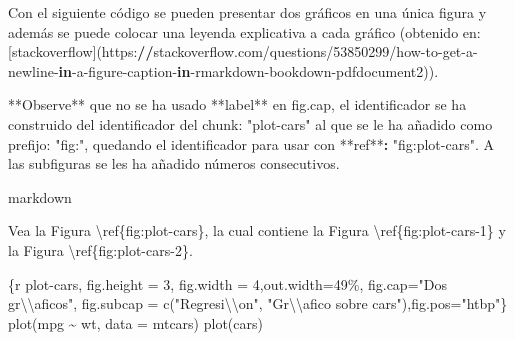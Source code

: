 \documentclass[11pt,a4paper,oneside,]{article}
\newenvironment{Shaded}{\begin{snugshade}}{\end{snugshade}}
\newcommand{\AttributeTok}[1]{\textcolor[rgb]{0.77,0.63,0.00}{#1}}
\newcommand{\ControlFlowTok}[1]{\textcolor[rgb]{0.13,0.29,0.53}{\textbf{#1}}}
\newcommand{\DecValTok}[1]{\textcolor[rgb]{0.00,0.00,0.81}{#1}}
\newcommand{\ErrorTok}[1]{\textcolor[rgb]{0.64,0.00,0.00}{\textbf{#1}}}
\newcommand{\NormalTok}[1]{#1}
\newcommand{\SpecialCharTok}[1]{\textcolor[rgb]{0.00,0.00,0.00}{#1}}
\newcommand{\StringTok}[1]{\textcolor[rgb]{0.31,0.60,0.02}{#1}}
\numberwithin{dummy}{section}
\theoremstyle{ocrenumbox}
\theoremstyle{blacknumex}
\theoremstyle{blacknumbox}
\theoremstyle{ocrenum}
\theoremstyle{ocrenum}
\begin{document}
\begin{Shaded}
\begin{Highlighting}[numbers=left,,]
\NormalTok{Con el siguiente código se pueden presentar dos gráficos en una única figura y además se puede colocar una leyenda explicativa a cada gráfico (obtenido en}\SpecialCharTok{:}\NormalTok{ [stackoverflow](https}\SpecialCharTok{:}\ErrorTok{//}\NormalTok{stackoverflow.com}\SpecialCharTok{/}\NormalTok{questions}\SpecialCharTok{/}\DecValTok{53850299}\SpecialCharTok{/}\NormalTok{how}\SpecialCharTok{{-}}\NormalTok{to}\SpecialCharTok{{-}}\NormalTok{get}\SpecialCharTok{{-}}\NormalTok{a}\SpecialCharTok{{-}}\NormalTok{newline}\SpecialCharTok{{-}}\ControlFlowTok{in}\SpecialCharTok{{-}}\NormalTok{a}\SpecialCharTok{{-}}\NormalTok{figure}\SpecialCharTok{{-}}\NormalTok{caption}\SpecialCharTok{{-}}\ControlFlowTok{in}\SpecialCharTok{{-}}\NormalTok{rmarkdown}\SpecialCharTok{{-}}\NormalTok{bookdown}\SpecialCharTok{{-}}\NormalTok{pdfdocument2)).}


\SpecialCharTok{**}\NormalTok{Observe}\SpecialCharTok{**}\NormalTok{ que no se ha usado }\SpecialCharTok{**}\NormalTok{label}\SpecialCharTok{**}\NormalTok{ en }\StringTok{\textasciigrave{}}\AttributeTok{fig.cap}\StringTok{\textasciigrave{}}\NormalTok{, el identificador se ha construido del identificador del chunk}\SpecialCharTok{:} \StringTok{"plot{-}cars"}\NormalTok{ al que se le ha añadido como prefijo}\SpecialCharTok{:} \StringTok{"fig:"}\NormalTok{, quedando el identificador para usar con }\SpecialCharTok{**}\NormalTok{ref}\SpecialCharTok{**}\ErrorTok{:} \StringTok{"fig:plot{-}cars"}\NormalTok{. A las subfiguras se les ha añadido números consecutivos.}

\StringTok{\textasciigrave{}\textasciigrave{}\textasciigrave{}\textasciigrave{}}\NormalTok{markdown}

\NormalTok{Vea la Figura \textbackslash{}ref\{fig}\SpecialCharTok{:}\NormalTok{plot}\SpecialCharTok{{-}}\NormalTok{cars\}, la cual contiene la Figura }
\NormalTok{\textbackslash{}ref\{fig}\SpecialCharTok{:}\NormalTok{plot}\SpecialCharTok{{-}}\NormalTok{cars}\DecValTok{{-}1}\NormalTok{\} y la Figura \textbackslash{}ref\{fig}\SpecialCharTok{:}\NormalTok{plot}\SpecialCharTok{{-}}\NormalTok{cars}\DecValTok{{-}2}\NormalTok{\}.}

\StringTok{\textasciigrave{}\textasciigrave{}\textasciigrave{}}\AttributeTok{\{r plot{-}cars, fig.height = 3, fig.width = 4,out.width=\textquotesingle{}49\%\textquotesingle{}, }
\AttributeTok{fig.cap="Dos gr}\SpecialCharTok{\textbackslash{}\textbackslash{}}\AttributeTok{\textquotesingle{}aficos", fig.subcap = c("Regresi}\SpecialCharTok{\textbackslash{}\textbackslash{}}\AttributeTok{\textquotesingle{}on", }
\AttributeTok{"Gr}\SpecialCharTok{\textbackslash{}\textbackslash{}}\AttributeTok{\textquotesingle{}afico sobre cars"),fig.pos="htbp"\}}
\AttributeTok{plot(mpg \textasciitilde{} wt, data = mtcars)}
\AttributeTok{plot(cars)}
\StringTok{\textasciigrave{}\textasciigrave{}\textasciigrave{}}


\end{Highlighting}
\end{Shaded}
\end{document}
